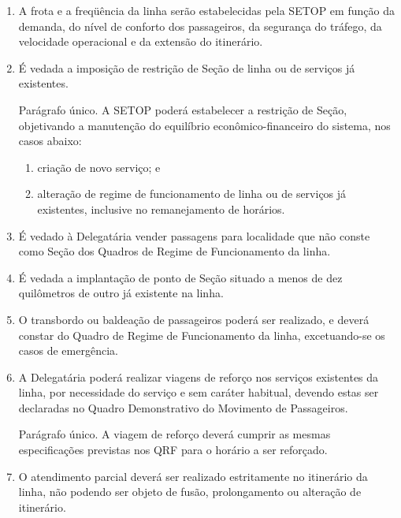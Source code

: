 \begin{enumerate}[resume, label=Art. \arabic*]
\begin{enumerate}[label=\roman*.]
\end{enumerate}

\item A frota e a freqüência da linha serão estabelecidas pela SETOP em função da demanda, do nível de conforto dos passageiros, da segurança do tráfego, da velocidade operacional e da extensão do itinerário.


\item É vedada a imposição de restrição de Seção de linha ou de serviços já existentes.

Parágrafo único. A SETOP poderá estabelecer a restrição de Seção, objetivando a manutenção do equilíbrio econômico-financeiro do sistema, nos casos abaixo:

\begin{enumerate}[label=\roman*.]

\item criação de novo serviço; e

\item alteração de regime de funcionamento de linha ou de serviços já existentes, inclusive no remanejamento de horários.

\end{enumerate}

\item É vedado à Delegatária vender passagens para localidade que não conste como Seção dos Quadros de Regime de Funcionamento da linha.

\item É vedada a implantação de ponto de Seção situado a menos de dez quilômetros de outro já existente na linha.

\item O transbordo ou baldeação de passageiros poderá ser realizado, e deverá constar do Quadro de Regime de Funcionamento da linha, excetuando-se os casos de emergência.

\item A Delegatária poderá realizar viagens de reforço nos serviços existentes da linha, por necessidade do serviço e sem caráter habitual, devendo estas ser declaradas no Quadro Demonstrativo do Movimento de Passageiros.

Parágrafo único. A viagem de reforço deverá cumprir as mesmas especificações previstas nos QRF para o horário a ser reforçado.

\item O atendimento parcial deverá ser realizado estritamente no itinerário da linha, não podendo ser objeto de fusão, prolongamento ou alteração de itinerário.


\end{enumerate}
